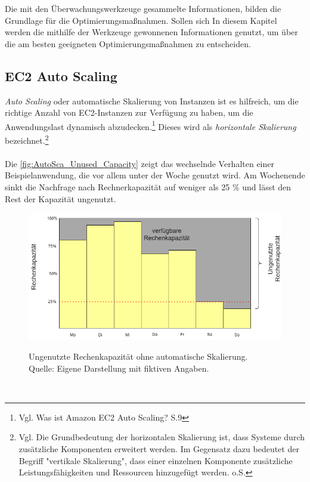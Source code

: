 Die mit den Überwachungswerkzeuge gesammelte Informationen, bilden die Grundlage für die Optimierungsmaßnahmen. Sollen sich In diesem Kapitel werden die mithilfe der Werkzeuge gewonnenen Informationen genutzt, um über die am besten geeigneten Optimierungsmaßnahmen zu entscheiden.

\subsection{EC2 Auto Scaling}
\textit{Auto Scaling} oder automatische Skalierung von Instanzen ist es hilfreich, um die richtige Anzahl von EC2-Instanzen zur Verfügung zu haben, um die Anwendungslast dynamisch abzudecken.\footnote{Vgl. Was ist Amazon EC2 Auto Scaling? S.9\cite{AMZ31} } Dieses wird als \textit{horizontale Skalierung} bezeichnet.\footnote{Vgl. Die Grundbedeutung der horizontalen Skalierung ist, dass Systeme durch zusätzliche Komponenten erweitert werden. Im Gegensatz dazu bedeutet der Begriff "vertikale Skalierung", dass einer einzelnen Komponente zusätzliche Leistungsfähigkeiten und Ressourcen hinzugefügt werden. o.S.\cite{TECH1} }
\\\\
Die \autoref{fig:AutoSca_Unused_Capacity} zeigt das wechselnde Verhalten einer Beispielanwendung, die vor allem unter der Woche genutzt wird. Am Wochenende sinkt die Nachfrage nach Rechnerkapazität auf weniger als 25 \% und lässt den Rest der Kapazität ungenutzt. 
\begin{figure}[h]
    \centering
    \includegraphics[scale=0.5]{sources/AutoCap Unused Capacity}
    \caption[Ungenutzte Rechenkapazität ohne automatische Skalierung]{}
    \label{fig:AutoSca_Unused_Capacity} Ungenutzte Rechenkapazität ohne automatische Skalierung. \\
    Quelle: Eigene Darstellung mit fiktiven Angaben. 
  \end{figure}\\
